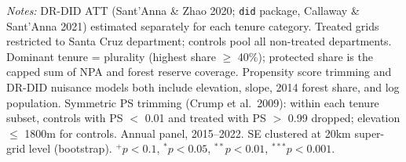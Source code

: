 \begin{table}[htbp]
\begin{tabular}{lcccccc}
\bottomrule
\end{tabular}
\begin{tablenotes}[flushleft]
\small
\item \textit{Notes:} DR-DID ATT (Sant'Anna \& Zhao 2020; \texttt{did} package, Callaway \& Sant'Anna 2021) estimated separately for each tenure category. Treated grids restricted to Santa Cruz department; controls pool all non-treated departments. Dominant tenure = plurality (highest share $\geq$ 40\%); protected share is the capped sum of NPA and forest reserve coverage. Propensity score trimming and DR-DID nuisance models both include elevation, slope, 2014 forest share, and log population. Symmetric PS trimming (Crump et al.\ 2009): within each tenure subset, controls with PS $<$ 0.01 and treated with PS $>$ 0.99 dropped; elevation $\leq$ 1800m for controls. Annual panel, 2015--2022. SE clustered at 20km super-grid level (bootstrap). $^{+}p<0.1$, $^{*}p<0.05$, $^{**}p<0.01$, $^{***}p<0.001$.
\end{tablenotes}
\end{table}
